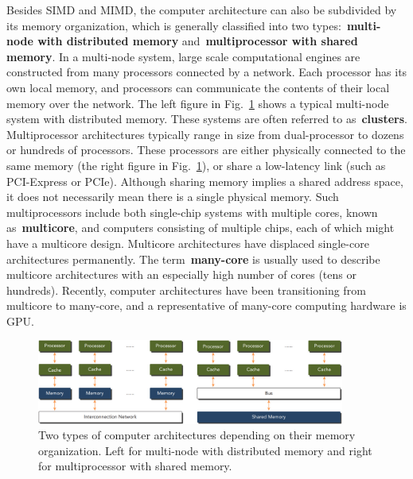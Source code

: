 \par
Besides SIMD and MIMD, the computer architecture can also be subdivided by its memory organization, which is generally classified into two types:~\textbf{multi-node with distributed memory} and~\textbf{multiprocessor with shared memory}.
In a multi-node system, large scale computational engines are constructed from many processors connected by a network. Each processor has its own local memory, and processors can communicate the contents of their local memory over the network.
The left figure in Fig.~\ref{fig:multinode_vs_multicore} shows a typical multi-node system with distributed memory. These systems are often referred to as~\textbf{clusters}.
Multiprocessor architectures typically range in size from dual-processor to dozens or hundreds of processors. These processors are either physically connected to the same memory (the right figure in Fig.~\ref{fig:multinode_vs_multicore}), or share a low-latency link (such as PCI-Express or PCIe).
Although sharing memory implies a shared address space, it does not necessarily mean there is a single physical memory.
Such multiprocessors include both single-chip systems with multiple cores, known as~\textbf{multicore}, and computers consisting of multiple chips, each of which might have a multicore design.
Multicore architectures have displaced single-core architectures permanently. The term~\textbf{many-core} is usually used to describe multicore architectures with an especially high number of cores (tens or hundreds).
Recently, computer architectures have been transitioning from multicore to many-core, and a representative of many-core computing hardware is GPU.


\begin{figure}[!h]
\centering\includegraphics[width=0.9\textwidth]{fig_hardware/multinode_vs_multicore.jpg}
\caption{Two types of computer architectures depending on their memory organization. Left for multi-node with distributed memory and right for multiprocessor with shared memory.}\label{fig:multinode_vs_multicore}
\end{figure}




